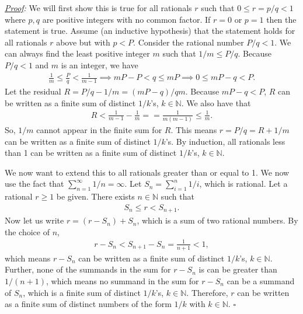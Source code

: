 \documentclass[11pt]{article}
\newcommand{\f}[2]{\frac{#1}{#2}}
\begin{document}
\begin{enumerate}[(a)]
	\noindent \textit{\underline{Proof}:} We will first show this is true for all rationals $r$ such that $0 \leq r=p/q < 1$ where $p,q$ are positive integers with no common factor. If $r=0$ or $p=1$ then the statement is true. Assume (an inductive hypothesis) that the statement holds for all rationals $r$ above but with $p<P$. Consider the rational number $P/q < 1$. We can always find the least positive integer $m$ such that $1/m \leq P/q$. Because $P/q < 1$ and $m$ is an integer, we have 
	\begin{align*}
	\f{1}{m} \leq \f{P}{q} < \f{1}{m-1} \implies mP - P < q \leq mP \implies 0 \leq mP-q < P.
	\end{align*}  
	Let the residual $R = P/q - 1/m = (mP-q)/qm$. Because $mP -q < P$, $R$ can be written as a finite sum of distinct $1/k$'s, $k\in \mathbb{N}$. We also have that 
	\begin{align*}
	R < \f{1}{m-1} - \f{1}{m} = = \f{1}{m(m-1)} \leq \f{1}{m}.
	\end{align*} 
	So, $1/m$ cannot appear in the finite sum for $R$. This means $r = P/q = R + 1/m$ can be written as a finite sum of distinct $1/k$'s. By induction, all rationals less than 1 can be written as a finite sum of distinct $1/k$'s, $k\in \mathbb{N}$. 
	
	We now want to extend this to all rationals greater than or equal to 1. We now use the fact that $\sum^\infty_{n=1}1/n = \infty$. Let $S_n = \sum^n_{i=1}1/i$, which is rational. Let a rational $r \geq 1$ be given. There exists $n\in \mathbb{N}$ such that 
	\begin{align*}
	S_{n} \leq r < S_{n+1}.
	\end{align*}
	Now let us write $r = (r - S_n) + S_n$, which is a sum of two rational numbers. By the choice of $n$,
	\begin{align*}
	r - S_n < S_{n+1} - S_n = \f{1}{n+1} < 1,
	\end{align*} 
	which means $r - S_n$ can be written as a finite sum of distinct $1/k$'s, $k\in \mathbb{N}$. Further, none of the summands in the sum for $r - S_n$ is can be greater than $1/(n+1)$, which means no summand in the sum for $r-S_n$ can be a summand of $S_n$, which is a finite sum of distinct $1/k$'s, $k\in \mathbb{N}$. Therefore, $r$ can be written as a finite sum of distinct numbers of the form $1/k$ with $k \in \mathbb{N}$. \hfill $\square$
	
 	
	 
\end{enumerate}
\end{document}
